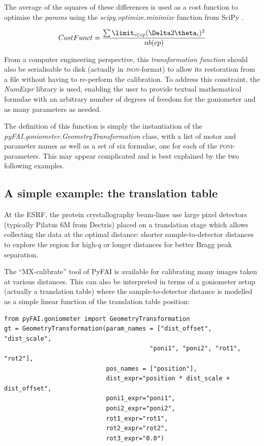 \documentclass[preprint, pdf]{iucr}              %
\begin{document}
The average of the squares of these differences is used as a cost function
to optimise the \textit{params} using the \textit{scipy.optimize.minimize}
function from SciPy \cite{scipy}.

$$
CostFunct = \frac{ \sum\limit_{i \in cp} {(\Delta 2\theta_i)^2}} {nb(cp)} 
$$

From a computer engineering perspective, this \textit{transformation function}
should also be serialisable to disk (actually in \textsc{json}-format) to allow
its restoration from a file without having to re-perform the calibration. 
To address this constraint, the \textit{NumExpr} library \cite{numexpr} is
used, enabling the user to provide textual mathematical formulae with
an arbitrary number of degrees of freedom for the goniometer and as many parameters
as needed.

The definition of this function is simply the instantiation of the
\textit{pyFAI.goniometer.GeometryTransformation} class, with a list of
motor and parameter names as well as a set of six formulae, one for each of
the \textsc{poni}-parameters.
This may appear complicated and is best explained by the two following examples.

\subsection{A simple example: the translation table}

At the  ESRF, the protein crystallography beam-lines use large pixel detectors
(typically Pilatus 6M from Dectris) placed on a translation stage which allows
collecting the data at the optimal distance: shorter sample-to-detector
distances to explore the region for high-$q$ 
or longer distances for better Bragg peak separation.

The ``MX-calibrate'' tool of PyFAI is available for calibrating many images
taken at various distances.
This can also be interpreted in terms of a goniometer setup (actually a
translation table) where the sample-to-detector distance is modelled as a
simple linear function of the translation table position:

\begin{verbatim}
from pyFAI.goniometer import GeometryTransformation
gt = GeometryTransformation(param_names = ["dist_offset", "dist_scale", 
                                        "poni1", "poni2", "rot1", "rot2"],
                            pos_names = ["position"],
                            dist_expr="position * dist_scale + dist_offset", 
                            poni1_expr="poni1",
                            poni2_expr="poni2", 
                            rot1_expr="rot1", 
                            rot2_expr="rot2", 
                            rot3_expr="0.0")
\end{verbatim}
 
\end{document}
